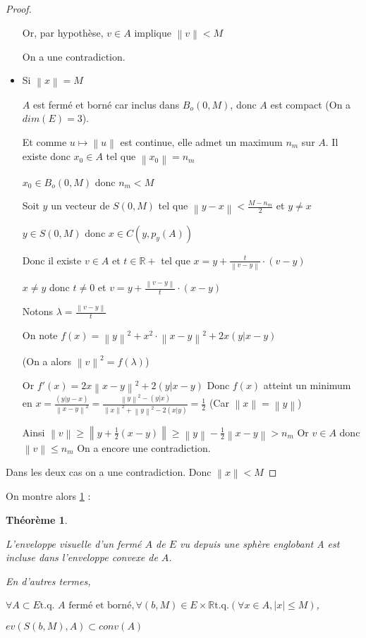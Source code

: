 \documentclass[a4paper]{article}
\newcommand{\norm}[1]{\left\lVert#1\right\rVert}
\newtheorem{theo}{Théorème}
\begin{document}
\begin{proof}
\begin{itemize}
Or, par hypothèse, $v \in A$ implique $\norm{v} < M$

On a une contradiction.

\item Si  $\norm{x} = M$

$A$ est fermé et borné car inclus dans $B_{o}(0, M)$, donc $A$ est compact (On a $dim(E) = 3$).

Et comme $u \mapsto \norm{u}$ est continue, elle admet un maximum $n_{m}$ sur $A$. Il existe donc $x_{0} \in A$ tel que $\norm{x_{0}} = n_{m}$

$x_{0} \in B_{o}(0, M)$ donc $n_{m} < M$

Soit $y$ un vecteur de $S(0, M)$ tel que $\norm{y - x} < \frac{M - n_{m}}{2}$ et $y \neq x$

$y \in S(0, M)$ donc $x \in C(y, p_{y}(A))$

Donc il existe $v \in A$ et $t \in \mathbb{R}+$ tel que $x = y + \frac{t}{\norm{v - y}} \cdot (v - y)$

$x \neq y$ donc $t \neq 0$ et $v = y + \frac{\norm{v - y}}{t} \cdot (x - y)$

Notons $\lambda = \frac{\norm{v - y}}{t}$

On note $f(x) = \norm{y}^{2} + x^{2} \cdot \norm{x - y}^{2} + 2 x (y|x - y)$

(On a alors $\norm{v}^{2} = f(\lambda)$)

Or $f'(x) = 2 x \norm{x - y}^{2} + 2(y|x - y)$
Donc $f(x)$ atteint un minimum en $x = \frac{(y|y - x)}{\norm{x - y}^2} = \frac{\norm{y}^{2} - (y|x)}{\norm{x}^{2} + \norm{y}^{2} - 2 (x|y)} = \frac{1}{2}$ (Car $\norm{x} = \norm{y}$)

Ainsi $\norm{v} \geqslant \norm{y + \frac{1}{2} (x - y)} \geqslant \norm{y} - \frac{1}{2} \norm{x - y} > n_{m}$
Or $v \in A$  donc $\norm{v} \leqslant n_{m}$
On a encore une contradiction.
\end{itemize}
Dans les deux cas on a une contradiction.
Donc $\norm{x} < M$
\end{proof}


On montre alors \ref{th1} :

\begin{theo}\label{th1}

L'enveloppe visuelle d'un fermé $A$ de $E$ vu depuis une sphère englobant A est incluse dans l'enveloppe convexe de $A$.

En d'autres termes, 

$\forall A \subset E \text{t.q. $A$ fermé et borné}, \forall (b, M) \in E \times \mathbb{R} \text{t.q.} (\forall x \in A, |x| \leqslant M)$,

$ev(S(b, M), A) \subset conv(A)$

\end{theo}
\end{document}
